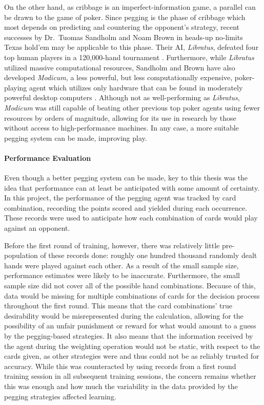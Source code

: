 On the other hand,
as cribbage is an imperfect-information game,
a parallel can be drawn to the game of poker.
%
Since pegging is the phase of cribbage
which most depends on predicting and countering the opponent's strategy,
recent successes by Dr.\ Tuomas Sandholm and Noam Brown
in heads-up no-limits Texas hold'em may be applicable to
this phase.
%
Their AI, \textit{Libratus},
defeated four top human players
in a 120,000-hand tournament
\cite{sandholm_poker}.
%
Furthermore, while \textit{Libratus} utilized massive computational resources,
Sandholm and Brown have also developed \textit{Modicum},
a less powerful, but less computationally expensive, poker-playing agent
which utilizes only hardware that can be found in moderately powerful desktop computers
\cite{sandholm_poker_improved}.
%
Although not as well-performing as \textit{Libratus},
\textit{Modicum} was still capable of beating other previous top poker agents
using fewer resources by orders of magnitude,
allowing for its use in research by those without access to high-performance machines.
%
In any case,
a more suitable pegging system can be made,
improving play.

\paragraph*{Performance Evaluation}

Even though a better pegging system can be made,
key to this thesis was the idea that performance can at least be
anticipated with some amount of certainty.
%
In this project,
the performance of the pegging agent was tracked by card combination,
recording the points scored and yielded during each occurrence.
%
These records were used to anticipate how each combination of cards would
play against an opponent.

Before the first round of training,
however,
there was relatively little pre-population of these records done:
roughly one hundred thousand randomly dealt hands were played against each
other.
%
As a result of the small sample size,
performance estimates were likely to be inaccurate.
%
Furthermore,
the small sample size did not cover all of the possible hand
combinations.
%
Because of this,
data would be missing for multiple combinations of cards
for the decision process
throughout the first round.
%
This means that the card combinations' true desirability would be
misrepresented during the calculation,
allowing for the possibility of an unfair
punishment or reward for what would amount to a guess by the
pegging-based strategies.
%
It also means that the information received by the agent during the weighting
operation would not be static, with respect to the cards given,
as other strategies were and thus could not be as
reliably trusted for accuracy.
%
While
this was counteracted by using records from a first round training session in 
all subsequent training sessions,
the concern remains whether this was enough
and how much the variability in the data provided by the pegging strategies
affected learning.

